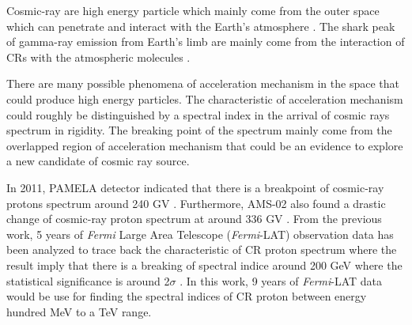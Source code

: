 Cosmic-ray are high energy particle which mainly come from the outer space which can penetrate and interact with the Earth's atmosphere \cite{HESS,Pacini,Clay}.
The shark peak of gamma-ray emission from Earth's limb are mainly come from the interaction of CRs with the atmospheric molecules \cite{Warit2009}.

There are many possible phenomena of acceleration mechanism in the
space that could produce high energy particles. The characteristic of acceleration mechanism could roughly be distinguished by a spectral index in the arrival of cosmic rays spectrum in rigidity.
The breaking point of the spectrum mainly come from the overlapped region of acceleration mechanism that could be an evidence to explore a new candidate of cosmic ray source.

In 2011, PAMELA detector indicated that there is a breakpoint of cosmic-ray protons spectrum around 240 GV \cite{PAMELA}.
Furthermore, AMS-02 also found a drastic change of cosmic-ray proton spectrum at around 336 GV \cite{AMS-02}.
From the previous work, 5 years of \textit{Fermi} Large Area Telescope
(\textit{Fermi}-LAT) observation data has been analyzed to trace back
the characteristic of CR proton spectrum where the result imply that there is
a breaking of spectral indice around 200 GeV where the statistical significance
is around 2$\sigma$ \cite{previouswork}. In this work, 9 years of \textit{Fermi}-LAT
data would be use for finding the spectral indices of CR proton between energy
hundred MeV to a TeV range.